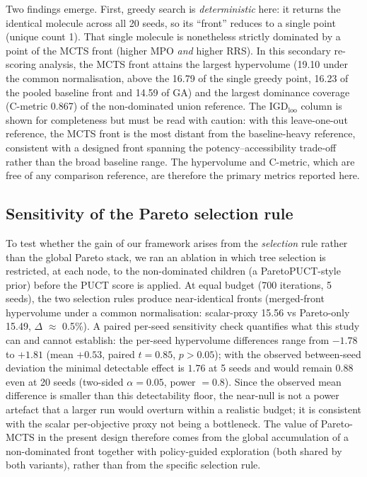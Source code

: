 \documentclass[10pt,a4paper]{article}
\begin{document}
Two findings emerge. First, greedy search is \emph{deterministic} here: it returns the identical molecule across all \num{20} seeds, so its ``front'' reduces to a single point (unique count \num{1}). That single molecule is nonetheless strictly dominated by a point of the MCTS front (higher MPO \emph{and} higher RRS). In this secondary re-scoring analysis, the MCTS front attains the largest hypervolume (\num{19.10} under the common normalisation, above the \num{16.79} of the single greedy point, \num{16.23} of the pooled baseline front and \num{14.59} of GA) and the largest dominance coverage (C-metric \num{0.867}) of the non-dominated union reference. The IGD${}_{\mathrm{loo}}$ column is shown for completeness but must be read with caution: with this leave-one-out reference, the MCTS front is the most distant from the baseline-heavy reference, consistent with a designed front spanning the potency--accessibility trade-off rather than the broad baseline range. The hypervolume and C-metric, which are free of any comparison reference, are therefore the primary metrics reported here.

\subsection{Sensitivity of the Pareto selection rule}
\label{sec:selection_ablation}

To test whether the gain of our framework arises from the \emph{selection} rule rather than the global Pareto stack, we ran an ablation in which tree selection is restricted, at each node, to the non-dominated children (a ParetoPUCT-style prior) before the PUCT score is applied. At equal budget (\num{700} iterations, \num{5} seeds), the two selection rules produce near-identical fronts (merged-front hypervolume under a common normalisation: scalar-proxy \num{15.56} vs Pareto-only \num{15.49}, $\Delta$ $\approx$ \num{0.5}\%). A paired per-seed sensitivity check quantifies what this study can and cannot establish: the per-seed hypervolume differences range from $\num{-1.78}$ to $+\num{1.81}$ (mean $+\num{0.53}$, paired $t=\num{0.85}$, $p>\num{0.05}$); with the observed between-seed deviation the minimal detectable effect is $\num{1.76}$ at \num{5} seeds and would remain $\num{0.88}$ even at \num{20} seeds (two-sided $\alpha=\num{0.05}$, power $=\num{0.8}$). Since the observed mean difference is smaller than this detectability floor, the near-null is not a power artefact that a larger run would overturn within a realistic budget; it is consistent with the scalar per-objective proxy not being a bottleneck. The value of Pareto-MCTS in the present design therefore comes from the global accumulation of a non-dominated front together with policy-guided exploration (both shared by both variants), rather than from the specific selection rule.
\end{document}
